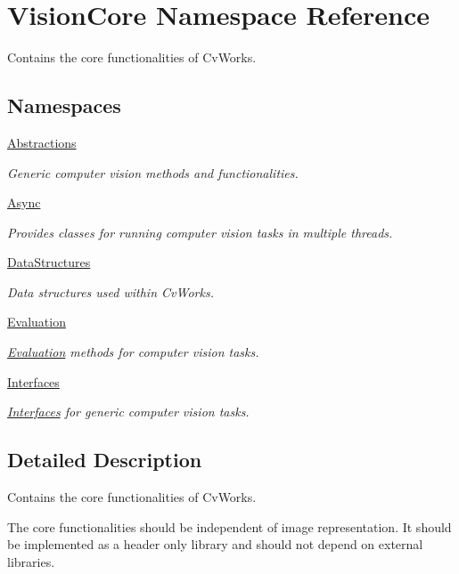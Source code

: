 \hypertarget{namespace_vision_core}{}\section{Vision\+Core Namespace Reference}
\label{namespace_vision_core}


Contains the core functionalities of Cv\+Works.  


\subsection*{Namespaces}
\begin{DoxyCompactItemize}
\item 
 \hyperlink{namespace_vision_core_1_1_abstractions}{Abstractions}
\begin{DoxyCompactList}\small\item\em Generic computer vision methods and functionalities. \end{DoxyCompactList}\item 
 \hyperlink{namespace_vision_core_1_1_async}{Async}
\begin{DoxyCompactList}\small\item\em Provides classes for running computer vision tasks in multiple threads. \end{DoxyCompactList}\item 
 \hyperlink{namespace_vision_core_1_1_data_structures}{Data\+Structures}
\begin{DoxyCompactList}\small\item\em Data structures used within Cv\+Works. \end{DoxyCompactList}\item 
 \hyperlink{namespace_vision_core_1_1_evaluation}{Evaluation}
\begin{DoxyCompactList}\small\item\em \hyperlink{namespace_vision_core_1_1_evaluation}{Evaluation} methods for computer vision tasks. \end{DoxyCompactList}\item 
 \hyperlink{namespace_vision_core_1_1_interfaces}{Interfaces}
\begin{DoxyCompactList}\small\item\em \hyperlink{namespace_vision_core_1_1_interfaces}{Interfaces} for generic computer vision tasks. \end{DoxyCompactList}\end{DoxyCompactItemize}


\subsection{Detailed Description}
Contains the core functionalities of Cv\+Works. 

The core functionalities should be independent of image representation. It should be implemented as a header only library and should not depend on external libraries. 